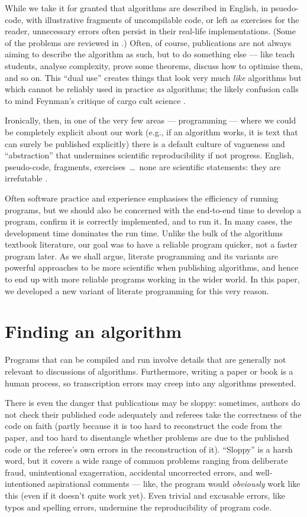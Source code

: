 \documentclass[12pt]{article}
\begin{document}
While we take it for granted that algorithms are described in English, in psuedo-code, with illustrative fragments of uncompilable code, or left as exercises for the reader, unnecessary errors often persist in their real-life implementations. (Some of the problems are reviewed in \cite{heedless,jmlr}.) Often, of course, publications are not always aiming to describe the algorithm as such, but to do something else --- like teach students, analyse complexity, prove some theorems, discuss how to optimise them, and so on. This ``dual use'' creates things that look very much \emph{like\/} algorithms but which cannot be reliably used in practice \emph{as\/} algorithms; the likely confusion calls to mind Feynman's critique of cargo cult science \cite{feynman}. 

Ironically, then, in one of the very few areas --- programming --- where we could be completely explicit about our work (e.g., if an algorithm works, it is text that can surely be published explicitly) there is a default culture of vagueness and ``abstraction'' that undermines scientific reproducibility if not progress. English, pseudo-code, fragments, exercises~\ldots\ none are scientific statements: they are irrefutable \cite{popper}. 

Often software practice and experience emphasises the efficiency of running programs, but we should also be concerned with the end-to-end time to develop a program, confirm it is correctly implemented, and to run it. In many cases, the development time dominates the run time. Unlike the bulk of the algorithms textbook literature, our goal was to have a reliable program quicker, not a faster program later. As we shall argue, literate programming and its variants are powerful approaches to be more scientific when publishing algorithms, and hence to end up with more reliable programs working in the wider world. In this paper, we developed a new variant of literate programming for this very reason.

\section{Finding an algorithm}
Programs that can be compiled and run involve details that are generally not relevant to discussions of algorithms. Furthermore, writing a paper or book is a human process, so transcription errors may creep into any algorithms presented. 

There is even the danger that publications may be sloppy: sometimes, authors do not check their published code adequately and referees take the correctness of the code on faith (partly because it is too hard to reconstruct the code from the paper, and too hard to disentangle whether problems are due to the published code or the referee's own errors in the reconstruction of it). ``Sloppy'' is a harsh word, but it covers a wide range of common problems ranging from deliberate fraud, unintentional exagerration, accidental uncorrected errors, and well-intentioned aspirational comments --- like, the program would \emph{obviously\/} work like this (even if it doesn't quite work yet). Even trivial and excusable errors, like typos and spelling errors, undermine the reproducibility of program code.
\end{document}
